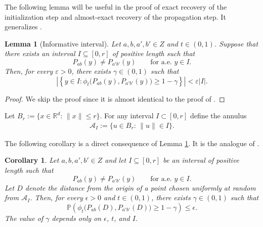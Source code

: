 \documentclass[11pt, a4paper]{amsart}
\newtheorem{lemma}[theorem]{Lemma}
\newtheorem{corollary}[theorem]{Corollary}
\newcommand{\R}{\mathbb{R}}
\newcommand{\1}{\mathbf{1}}
\theoremstyle{definition}
\theoremstyle{remark}
\theoremstyle{definition}
\begin{document}
The following lemma will be useful in the proof of exact recovery of the initialization step and almost-exact recovery of the propagation step. It generalizes {\cite[Lemma 5]{gaudio2026jan}}.

\begin{lemma}[Informative interval]
\label{lem: informative interval}
Let $a,b,a',b'\in Z$ and $t\in(0,1)$. Suppose that there exists an
interval $I\subseteq[0,r]$ of positive length such that
\[
P_{ab}(y)\neq P_{a'b'}(y)
\qquad\text{for a.e. }y\in I.
\]
Then, for every $\varepsilon>0$, there exists $\gamma\in(0,1)$ such that
\[
\left|
\left\{
y\in I:
\phi_t\bigl(P_{ab}(y),P_{a'b'}(y)\bigr)
\geq 1-\gamma
\right\}
\right|
<\varepsilon |I|.
\]
\end{lemma}

\begin{proof}
    We skip the proof since it is almost identical to the proof of \cite[Lemma 5]{gaudio2026jan}.%
\end{proof}

Let $B_r:=\{x \in \R^d:\,\|x\|\le r\}$. For any interval $I \subset [0,r]$ define the annulus
\begin{align}
\mathcal A_{I}:=\Big\{u \in B_r:\,\|u\|\in I \Big\}. \label{def:Aab}
\end{align}

The following corollary is a direct consequence of Lemma \ref{lem: informative interval}. It is the analogue of \cite[Corollary 1]{gaudio2026jan}.

\begin{corollary} \label{cor:D}
    Let $a,b,a',b'\in Z$ and let $I\subseteq[0,r]$ be an interval of positive length such that
    \[
    P_{ab}(y)\neq P_{a'b'}(y)
    \qquad\text{for a.e. }y\in I.
    \]
    Let $D$ denote the distance from the origin of a point chosen uniformly at random from $\mathcal A_I$. Then, for every $\epsilon>0$ and $t\in(0,1)$, there exists $\gamma\in(0,1)$ such that
    \[
    \mathbb P\left(
    \phi_t\bigl(P_{ab}(D),P_{a'b'}(D)\bigr)
    \geq 1-\gamma
    \right)
    \leq \epsilon.
    \]
    The value of $\gamma$ depends only on $\epsilon$, $t$, and $I$.
\end{corollary}




\end{document}
